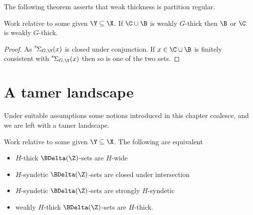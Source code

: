 The following theorem asserts that weak thickness is partition regular.

\begin{theorem}\label{thm_wt_partreg}
  Work relative to some given $\Y\subseteq\X$.
  If $\C\cup\B$ is weakly $G$-thick then $\B$ or $\C$ is weakly $G$-thick.
\end{theorem}

\begin{proof}
  As ${\mathstrut}^{\rm s}\kern-.1ex\Sigma_{G,\Y}(x)$ is closed under conjunction.
  If $x\in \C\cup\B$ is finitely consistent with ${\mathstrut}^{\rm s}\kern-.1ex\Sigma_{G,\Y}(x)$ then so is one of the two sets.
\end{proof}

\section{A tamer landscape}\label{tame_landscape}

Under suitable assumptions some notions introduced in this chapter coalesce, and we are left with a tamer landscape.

\begin{theorem}\label{thm_coalesce}
  Work relative to some given $\Y\subseteq\X$.
  The following are equivalent
  \begin{itemize}
    \item[1.] $H$-thick $\BDelta({\Z})$-sets are $H$-wide
    \item[2.] $H$-syndetic $\BDelta({\Z})$-sets are closed under intersection 
    \item[3.] $H$-syndetic $\BDelta({\Z})$-sets are strongly $H$-syndetic
    \item[4.] weakly $H$-thick $\BDelta({\Z})$-sets are $H$-thick.
  \end{itemize}
\end{theorem}

